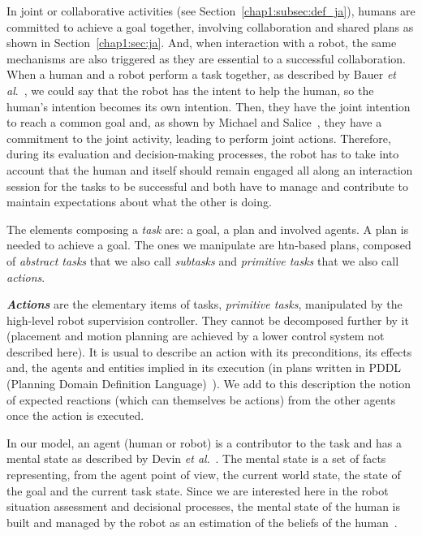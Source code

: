 \documentclass[a4paper,11pt,twoside]{StyleThese}
\begin{document}
In joint or collaborative activities (see Section~\ref{chap1:subsec:def_ja}), humans are committed to achieve a goal together, involving collaboration and shared plans as shown in Section~\ref{chap1:sec:ja}. And, when interaction with a robot, the same mechanisms are also triggered as they are essential to a successful collaboration. When a human and a robot perform a task together, as described by Bauer \textit{et al}.~\cite{bauer_2008_collab}, we could say that the robot has the intent to help the human, so the human's intention becomes its own intention. Then, they have the joint intention to reach a common goal and, as shown by Michael and Salice~\cite{michael_2017_commitment}, they have a commitment to the joint activity, leading to perform joint actions. Therefore, during its evaluation and decision-making processes, the robot has to take into account that the human and itself should remain engaged all along an interaction session for the tasks to be successful and both have to manage and contribute to maintain expectations about what the other is doing. 

The elements composing a \textit{task} are: a goal, a plan and involved agents. A plan is needed to achieve a goal. The ones we manipulate are \acrshort{htn}-based plans, composed of \emph{abstract tasks} that we also call \emph{subtasks} and \emph{primitive tasks} that we also call \emph{actions}.

\textbf{\textit{Actions}} are the elementary items of tasks, \emph{primitive tasks}, manipulated by the high-level robot supervision controller. They cannot be decomposed further by it (\eg placement and motion planning are achieved by a lower control system not described here). It is usual to describe an action with its preconditions, its effects and, the agents and entities implied in its execution (\eg in plans written in PDDL (Planning Domain Definition Language)~\cite{ghallab_98_pddl}). We add to this description the notion of expected reactions (which can themselves be actions) from the other agents once the action is executed.

In our model, an agent (human or robot) is a contributor to the task and has a mental state as described by Devin \textit{et al}.~\cite{devin_2016_implemented}. The mental state is a set of facts representing, from the agent point of view, the current world state, the state of the goal and the current task state. Since we are interested here in the robot situation assessment and decisional processes, the mental state of the human is built and managed by the robot as an estimation of the beliefs of the human~\cite{milliez_2014_framework, hiatt_2017_modeling,tabrez_2020}.
\end{document}
